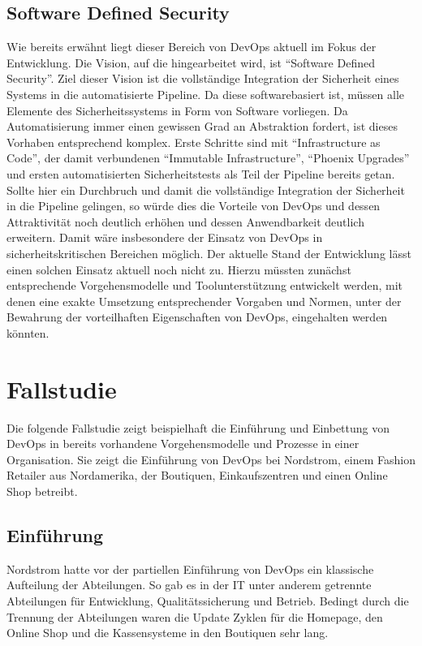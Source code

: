\subsection{Software Defined Security}
Wie bereits erwähnt liegt dieser Bereich von DevOps aktuell im Fokus der Entwicklung. 
Die Vision, auf die hingearbeitet wird, ist \enquote{Software Defined Security}. 
Ziel dieser Vision ist die vollständige Integration der Sicherheit eines Systems in die automatisierte Pipeline. 
Da diese softwarebasiert ist, müssen alle Elemente des Sicherheitssystems in Form von Software vorliegen. 
Da Automatisierung immer einen gewissen Grad an Abstraktion fordert, ist dieses Vorhaben entsprechend komplex. 
Erste Schritte sind mit \enquote{Infrastructure as Code}, der damit verbundenen \enquote{Immutable Infrastructure}, \enquote{Phoenix Upgrades} und ersten automatisierten Sicherheitstests als Teil der Pipeline bereits getan. 
Sollte hier ein Durchbruch und damit die vollständige Integration der Sicherheit in die Pipeline gelingen, so würde dies die Vorteile von DevOps und dessen Attraktivität noch deutlich erhöhen und dessen Anwendbarkeit deutlich erweitern.
Damit wäre insbesondere der Einsatz von DevOps in sicherheitskritischen Bereichen möglich. 
Der aktuelle Stand der Entwicklung lässt einen solchen Einsatz aktuell noch nicht zu. 
Hierzu müssten zunächst entsprechende Vorgehensmodelle und Toolunterstützung entwickelt werden, mit denen eine exakte Umsetzung entsprechender Vorgaben und Normen, unter der Bewahrung der vorteilhaften Eigenschaften von DevOps, eingehalten werden könnten. \parencite[Vgl.][S. 27]{fisher-miranda:2014}

\section{Fallstudie} %
Die folgende Fallstudie zeigt beispielhaft die Einführung und Einbettung von DevOps in bereits vorhandene Vorgehensmodelle und Prozesse in einer Organisation. 
Sie zeigt die Einführung von DevOps bei Nordstrom, einem Fashion Retailer aus Nordamerika, der Boutiquen, Einkaufszentren und einen Online Shop betreibt.

\subsection{Einführung}
Nordstrom hatte vor der partiellen Einführung von DevOps ein klassische Aufteilung der Abteilungen. 
So gab es in der IT unter anderem getrennte Abteilungen für Entwicklung, Qualitätssicherung und Betrieb.
Bedingt durch die Trennung der Abteilungen waren die Update Zyklen für die Homepage, den Online Shop und die Kassensysteme in den Boutiquen sehr lang. 
\parencite[Vgl.][S. 1 - 2]{Reed:2014}

